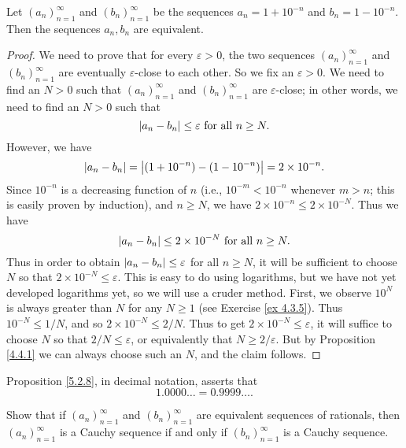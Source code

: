 \begin{proposition}\label{5.2.8}
    Let \((a_n)_{n = 1}^{\infty}\) and \((b_n)_{n = 1}^{\infty}\) be the sequences \(a_n = 1 + 10^{-n}\) and \(b_n = 1 - 10^{-n}\).
    Then the sequences \(a_n, b_n\) are equivalent.
\end{proposition}

\begin{proof}
    We need to prove that for every \(\varepsilon > 0\), the two sequences \((a_n)_{n = 1}^{\infty}\) and \((b_n)_{n = 1}^{\infty}\) are eventually \(\varepsilon\)-close to each other.
    So we fix an \(\varepsilon > 0\).
    We need to find an \(N > 0\) such that \((a_n)_{n = 1}^{\infty}\) and \((b_n)_{n = 1}^{\infty}\) are \(\varepsilon\)-close;
    in other words, we need to find an \(N > 0\) such that
    \[
        \abs*{a_n - b_n} \leq \varepsilon \text{ for all } n \geq N.
    \]
    However, we have
    \[
        \abs*{a_n - b_n} = \abs*{(1 + 10^{-n}) - (1 - 10^{-n})} = 2 \times 10^{-n}.
    \]
    Since \(10^{-n}\) is a decreasing function of \(n\) (i.e., \(10^{-m} < 10^{-n}\) whenever \(m > n\);
    this is easily proven by induction), and \(n \geq N\), we have \(2 \times 10^{-n} \leq 2 \times 10^{-N}\).
    Thus we have
    \[
        \abs*{a_n - b_n} \leq 2 \times 10^{-N} \text{ for all } n \geq N.
    \]
    Thus in order to obtain \(\abs*{a_n - b_n} \leq \varepsilon\) for all \(n \geq N\), it will be sufficient to choose \(N\) so that \(2 \times 10^{-N} \leq \varepsilon\).
    This is easy to do using logarithms, but we have not yet developed logarithms yet, so we will use a cruder method.
    First, we observe \(10^N\) is always greater than \(N\) for any \(N \geq 1\) (see Exercise \ref{ex 4.3.5}).
    Thus \(10^{-N} \leq 1 / N\), and so \(2 \times 10^{-N} \leq 2 / N\).
    Thus to get \(2 \times 10^{-N} \leq \varepsilon\), it will suffice to choose \(N\) so that \(2 / N \leq \varepsilon\), or equivalently that \(N \geq 2 / \varepsilon\).
    But by Proposition \ref{4.4.1} we can always choose such an \(N\), and the claim follows.
\end{proof}

\begin{remark}\label{5.2.9}
    Proposition \ref{5.2.8}, in decimal notation, asserts that
    \[
        1.0000 \dots = 0.9999 \dots.
    \]
\end{remark}

\exercisesection

\begin{exercise}\label{ex 5.2.1}
    Show that if \((a_n)_{n = 1}^{\infty}\) and \((b_n)_{n = 1}^{\infty}\) are equivalent sequences of rationals, then \((a_n)_{n = 1}^{\infty}\) is a Cauchy sequence if and only if \((b_n)_{n = 1}^{\infty}\) is a Cauchy sequence.
\end{exercise}

